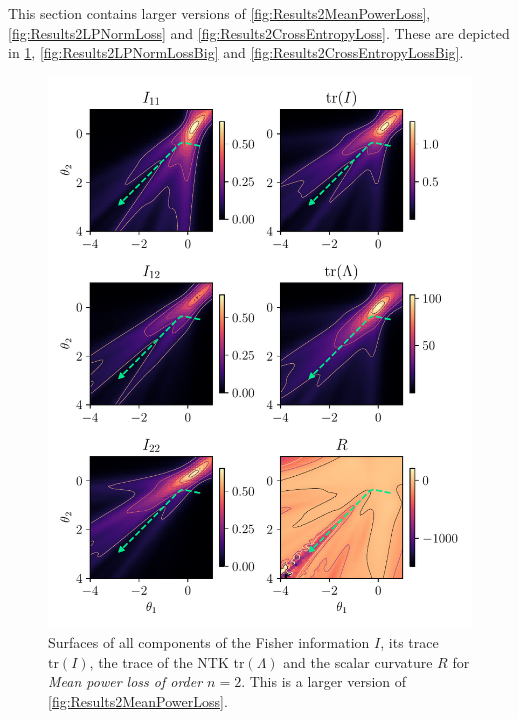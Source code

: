 This section contains larger versions of \cref{fig:Results2MeanPowerLoss}, \cref{fig:Results2LPNormLoss} and \cref{fig:Results2CrossEntropyLoss}. These are depicted in \cref{fig:Results2MeanPowerLossBig}, \cref{fig:Results2LPNormLossBig} and \cref{fig:Results2CrossEntropyLossBig}.
\begin{figure}
	\centering
	\includegraphics{Experiment2/plots/MeanPowerLoss2_tracecomparison_Big.pdf}
	\caption{Surfaces of all components of the Fisher information $I$, its trace $\mathrm{tr}(I)$, the trace of the NTK $\mathrm{tr}(\Lambda)$ and the scalar curvature $R$ for \emph{Mean power loss of order $n=2$}. This is a larger version of \cref{fig:Results2MeanPowerLoss}.}
	\label{fig:Results2MeanPowerLossBig}
\end{figure}

